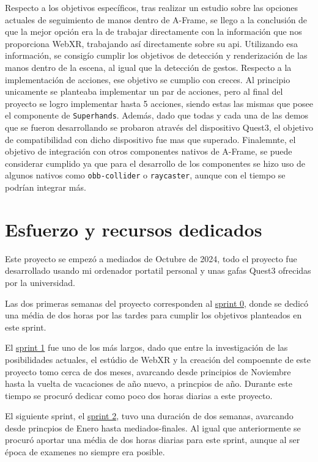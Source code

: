 \documentclass[a4paper, 12pt]{book}
\begin{document}
Respecto a los objetivos específicos, tras realizar un estudio sobre las opciones actuales de seguimiento de manos dentro de A-Frame, se llego a la conclusión de que la mejor opción era la de trabajar directamente con la información que nos proporciona WebXR, trabajando así directamente sobre su api. 
Utilizando esa información, se consigío cumplir los objetivos de detección y renderización de las manos dentro de la escena, al igual que la detección de gestos. 
Respecto a la implementación de acciones, ese objetivo se cumplio con creces. Al principio unicamente se planteaba implementar un par de acciones, pero al final del proyecto se logro implementar hasta 5 acciones, siendo estas las mismas que posee el componente de \texttt{Superhands}.
Además, dado que todas y cada una de las demos que se fueron desarrollando se probaron através del dispositivo Quest3, el objetivo de compatibilidad con dicho dispositivo fue mas que superado.
Finalemnte, el objetivo de integración con otros componentes nativos de A-Frame, se puede considerar cumplido ya que para el desarrollo de los componentes se hizo uso de algunos nativos como \texttt{obb-collider} o \texttt{raycaster}, aunque con el tiempo se podrían integrar más.

\section{Esfuerzo y recursos dedicados}
\label{sec:esfuerzos}

Este proyecto se empezó a mediados de Octubre de 2024, todo el proyecto fue desarrollado usando mi ordenador portatil personal y unas gafas Quest3 ofrecidas por la universidad.

Las dos primeras semanas del proyecto corresponden al \hyperref[sec:sprint0]{sprint 0}, donde se dedicó una média de dos horas por las tardes para cumplir los objetivos planteados en este sprint.

El \hyperref[sec:sprint1]{sprint 1} fue uno de los más largos, dado que entre la investigación de las posibilidades actuales, el estúdio de WebXR y la creación del compoennte de este proyecto tomo cerca de dos meses, avarcando desde principios de Noviembre hasta la vuelta de vacaciones de año nuevo, a princpios de año. Durante este tiempo se procuró dedicar como poco dos horas diarias a este proyecto.

El siguiente sprint, el \hyperref[sec:sprint2]{sprint 2}, tuvo una duración de dos semanas, avarcando desde princpios de Enero hasta mediados-finales. Al igual que anteriormente se procuró aportar una média de dos horas diarias para este sprint, aunque al ser época de examenes no siempre era posible.
\end{document}
